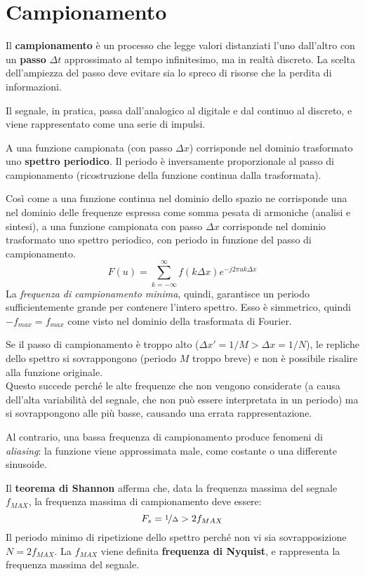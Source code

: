 \section{Campionamento}
Il \textbf{campionamento} è un processo che legge valori distanziati l'uno dall'altro con un \textbf{passo} $\Delta t$ approssimato al tempo infinitesimo, ma in realtà discreto. La scelta dell'ampiezza del passo deve evitare sia lo spreco di risorse che la perdita di informazioni.

Il segnale, in pratica, passa dall'analogico al digitale e dal continuo al discreto, e viene rappresentato come una serie di impulsi.

A una funzione campionata (con passo $\Delta x$) corrisponde nel dominio trasformato uno \textbf{spettro periodico}. Il periodo è inversamente proporzionale al passo di campionamento (ricostruzione della funzione continua dalla trasformata).

Così come a una funzione continua nel dominio dello spazio ne corrisponde una nel dominio delle frequenze espressa come somma pesata di armoniche (analisi e sintesi), a una funzione campionata con passo $\Delta x$ corrisponde nel dominio trasformato uno spettro periodico, con periodo in funzione del passo di campionamento.
$$F(u) = \sum_{k=-\infty}^{\infty} f(k\Delta x)e^{-j2\pi uk \Delta x}$$
La \textit{frequenza di campionamento minima}, quindi, garantisce un periodo sufficientemente grande per contenere l'intero spettro. Esso è simmetrico, quindi $-f_{max} = f_{max}$ come visto nel dominio della trasformata di Fourier.

Se il passo di campionamento è troppo alto ($\Delta x' = 1/M > \Delta x = 1/N$), le repliche dello spettro si sovrappongono (periodo $M$ troppo breve) e non è possibile risalire alla funzione originale. \\
Questo succede perché le alte frequenze che non vengono considerate (a causa dell'alta variabilità del segnale, che non può essere interpretata in un periodo) ma si sovrappongono alle più basse, causando una errata rappresentazione.

Al contrario, una bassa frequenza di campionamento produce fenomeni di \textit{aliasing}: la funzione viene approssimata male, come costante o una differente sinusoide.

Il \textbf{teorema di Shannon} afferma che, data la frequenza massima del segnale $f_{MAX}$, la frequenza massima di campionamento deve essere:
$$F_s = \nicefrac{1}{\Delta} > 2f_{MAX}$$
Il periodo minimo di ripetizione dello spettro perché non vi sia sovrapposizione $N = 2f_{MAX}$. La $f_{MAX}$ viene definita \textbf{frequenza di Nyquist}, e rappresenta la frequenza massima del segnale.

